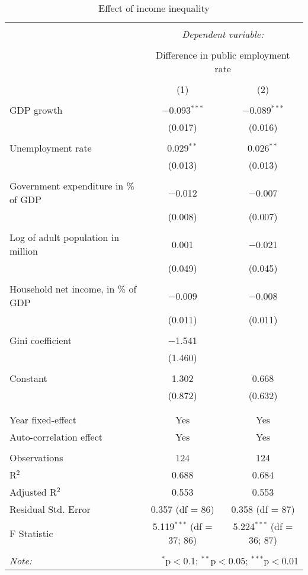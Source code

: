 
\begin{table}[!htbp] \centering 
  \caption{Effect of income inequality} 
  \label{} 
\begin{tabular}{@{\extracolsep{5pt}}lcc} 
\\[-1.8ex]\hline 
\hline \\[-1.8ex] 
 & \multicolumn{2}{c}{\textit{Dependent variable:}} \\ 
\cline{2-3} 
\\[-1.8ex] & \multicolumn{2}{c}{Difference in public employment rate} \\ 
\\[-1.8ex] & (1) & (2)\\ 
\hline \\[-1.8ex] 
 GDP growth & $-$0.093$^{***}$ & $-$0.089$^{***}$ \\ 
  & (0.017) & (0.016) \\ 
  & & \\ 
 Unemployment rate & 0.029$^{**}$ & 0.026$^{**}$ \\ 
  & (0.013) & (0.013) \\ 
  & & \\ 
 Government expenditure in \% of GDP & $-$0.012 & $-$0.007 \\ 
  & (0.008) & (0.007) \\ 
  & & \\ 
 Log of adult population in million & 0.001 & $-$0.021 \\ 
  & (0.049) & (0.045) \\ 
  & & \\ 
 Household net income, in \% of GDP & $-$0.009 & $-$0.008 \\ 
  & (0.011) & (0.011) \\ 
  & & \\ 
 Gini coefficient & $-$1.541 &  \\ 
  & (1.460) &  \\ 
  & & \\ 
 Constant & 1.302 & 0.668 \\ 
  & (0.872) & (0.632) \\ 
  & & \\ 
\hline \\[-1.8ex] 
Year fixed-effect & Yes & Yes \\ 
Auto-correlation effect & Yes & Yes \\ 
\hline \\[-1.8ex] 
Observations & 124 & 124 \\ 
R$^{2}$ & 0.688 & 0.684 \\ 
Adjusted R$^{2}$ & 0.553 & 0.553 \\ 
Residual Std. Error & 0.357 (df = 86) & 0.358 (df = 87) \\ 
F Statistic & 5.119$^{***}$ (df = 37; 86) & 5.224$^{***}$ (df = 36; 87) \\ 
\hline 
\hline \\[-1.8ex] 
\textit{Note:}  & \multicolumn{2}{r}{$^{*}$p$<$0.1; $^{**}$p$<$0.05; $^{***}$p$<$0.01} \\ 
\end{tabular} 
\end{table} 
